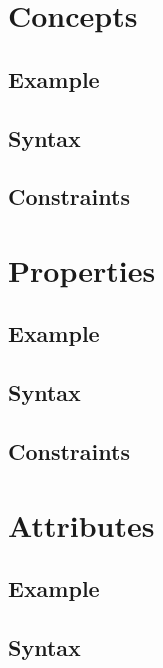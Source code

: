 \documentclass[a4paper,oneside,12pt, extrafontsizes]{memoir}
\theoremstyle{definition}
\theoremstyle{definition}
\theoremstyle{definition}
\theoremstyle{definition}
\begin{document}
\chapter{Concepts}
\label{ch:concepts}


\section{Example}


\section{Syntax}


\section{Constraints}


\chapter{Properties}
\label{ch:properties}


\section{Example}


\section{Syntax}


\section{Constraints}


\chapter{Attributes}
\label{ch:attributes}


\section{Example}


\section{Syntax}

\end{document}
